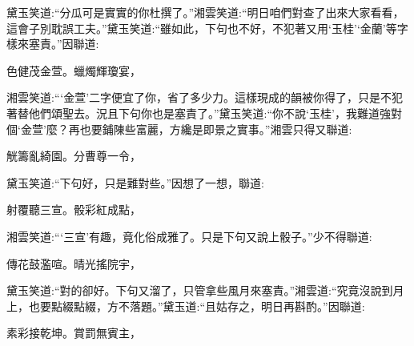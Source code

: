 \begin{parag}
    黛玉笑道:“分瓜可是實實的你杜撰了。”湘雲笑道:“明日咱們對查了出來大家看看，這會子別耽誤工夫。”黛玉笑道:“雖如此，下句也不好，不犯著又用‘玉桂’‘金蘭’等字樣來塞責。”因聯道:
\end{parag}


\begin{poem}
    \begin{pl}色健茂金萱。蠟燭輝瓊宴，\end{pl}
\end{poem}


\begin{parag}
    湘雲笑道:“‘金萱’二字便宜了你，省了多少力。這樣現成的韻被你得了，只是不犯著替他們頌聖去。況且下句你也是塞責了。”黛玉笑道:“你不說‘玉桂’，我難道強對個‘金萱’麼？再也要鋪陳些富麗，方纔是即景之實事。”湘雲只得又聯道:
\end{parag}


\begin{poem}
    \begin{pl}觥籌亂綺園。分曹尊一令，\end{pl}
\end{poem}


\begin{parag}
    黛玉笑道:“下句好，只是難對些。”因想了一想，聯道:
\end{parag}


\begin{poem}
    \begin{pl}射覆聽三宣。骰彩紅成點，\end{pl}
\end{poem}


\begin{parag}
    湘雲笑道:“‘三宣’有趣，竟化俗成雅了。只是下句又說上骰子。”少不得聯道:
\end{parag}


\begin{poem}
    \begin{pl}傳花鼓濫喧。晴光搖院宇，\end{pl}
\end{poem}


\begin{parag}
    黛玉笑道:“對的卻好。下句又溜了，只管拿些風月來塞責。”湘雲道:“究竟沒說到月上，也要點綴點綴，方不落題。”黛玉道:“且姑存之，明日再斟酌。”因聯道:
\end{parag}


\begin{poem}
    \begin{pl}素彩接乾坤。賞罰無賓主，\end{pl}
\end{poem}


